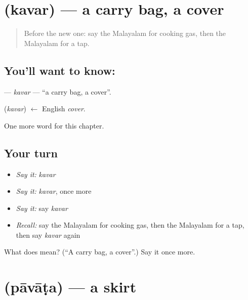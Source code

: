 \section[\texorpdfstring{\ml{കവർ} (kavar)}{കവർ (kavar)}]{ (kavar) — a carry bag, a cover}

\label{lesson:ML-C248-kavar}



\begin{quote}
Before the new one: say the Malayalam for cooking gas, then the Malayalam for a tap.
\end{quote}

\subsection*{You'll want to know: }
\textbf{} — \emph{kavar} — \textquotedblleft{}a carry bag, a cover\textquotedblright{}.

\begin{cousinweb}
\textbf{} (\emph{kavar}) $\leftarrow$ English \emph{cover}.
\end{cousinweb}

\begin{grammarlens}[title={What you've built}]
One more word for this chapter.
\end{grammarlens}

\subsection*{Your turn}
\begin{itemize}
\raggedright
  \item \emph{Say it:} \emph{kavar}
  \item \emph{Say it:} \emph{kavar}, once more
  \item \emph{Say it:} say \emph{kavar}
  \item \emph{Recall:} say the Malayalam for cooking gas, then the Malayalam for a tap, then say \emph{kavar} again
\end{itemize}

\begin{tcolorbox}[breakable,colback=teal!4,colframe=teal!35!black,title={Before you move on}]
What does  mean? (\textquotedblleft{}A carry bag, a cover\textquotedblright{}.) Say it once more.
\end{tcolorbox}
\section[\texorpdfstring{\ml{പാവാട} (pāvāṭa)}{പാവാട (pāvāṭa)}]{ (pāvāṭa) — a skirt}

